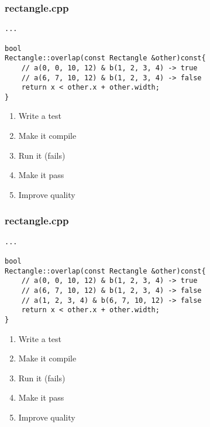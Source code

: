 \begin{frame}[fragile]
\frametitle{rectangle.cpp}
\begin{minipage}[t]{0.48\linewidth}
\begin{lstlisting}
...

bool 
Rectangle::overlap(const Rectangle &other)const{
    // a(0, 0, 10, 12) & b(1, 2, 3, 4) -> true
    // a(6, 7, 10, 12) & b(1, 2, 3, 4) -> false
    return x < other.x + other.width;
}
\end{lstlisting}
\end{minipage}\hfill
\begin{minipage}[t]{0.28\linewidth}
  \small
  \begin{enumerate} 
    \item \textcolor{deadcolor}{Write a test}
    \item \textcolor{deadcolor}{Make it compile}
    \item \textcolor{deadcolor}{Run it (fails)}
    \item \textcolor{activecolor}{Make it pass}
    \item \textcolor{deadcolor}{Improve quality}
  \end{enumerate} 
\end{minipage}
\end{frame}


\begin{frame}[fragile]
\frametitle{rectangle.cpp}
\begin{minipage}[t]{0.48\linewidth}
\begin{lstlisting}
...

bool 
Rectangle::overlap(const Rectangle &other)const{
    // a(0, 0, 10, 12) & b(1, 2, 3, 4) -> true
    // a(6, 7, 10, 12) & b(1, 2, 3, 4) -> false
    // a(1, 2, 3, 4) & b(6, 7, 10, 12) -> false
    return x < other.x + other.width;
}
\end{lstlisting}
\end{minipage}\hfill
\begin{minipage}[t]{0.28\linewidth}
  \small
  \begin{enumerate} 
    \item \textcolor{deadcolor}{Write a test}
    \item \textcolor{deadcolor}{Make it compile}
    \item \textcolor{deadcolor}{Run it (fails)}
    \item \textcolor{activecolor}{Make it pass}
    \item \textcolor{deadcolor}{Improve quality}
  \end{enumerate} 
\end{minipage}
\end{frame}


